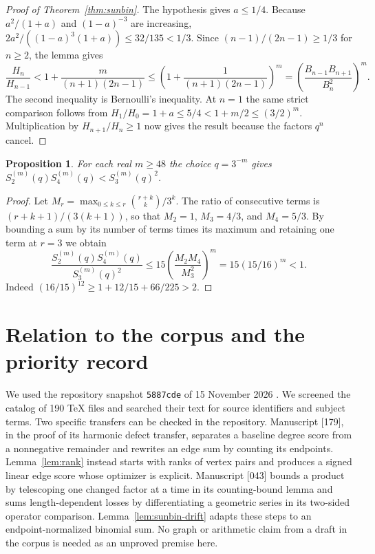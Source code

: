 \documentclass[11pt,a4paper]{article}
\newtheorem{proposition}[theorem]{Proposition}
\theoremstyle{definition}\newtheorem{problem}[theorem]{Problem}
\begin{document}
\begin{proof}[Proof of Theorem~\ref{thm:sunbin}]
The hypothesis gives $a\le1/4$. Because $a^2/(1+a)$ and
$(1-a)^{-3}$ are increasing,
$2a^2/((1-a)^3(1+a))\le 32/135<1/3$. Since
$(n-1)/(2n-1)\ge1/3$ for $n\ge2$, the lemma gives
\[
 \frac{H_n}{H_{n-1}}<
 1+\frac{m}{(n+1)(2n-1)}
 \le\left(1+\frac{1}{(n+1)(2n-1)}\right)^m
 =\left(\frac{B_{n-1}B_{n+1}}{B_n^2}\right)^m.
\]
The second inequality is Bernoulli's inequality. At $n=1$ the same
strict comparison follows from $H_1/H_0=1+a\le5/4<1+m/2\le(3/2)^m$.
Multiplication by $H_{n+1}/H_n\ge1$ now gives the result because the
factors $q^n$ cancel.
\end{proof}

\begin{proposition}\label{prop:sun-small-q}
For each real $m\ge48$ the choice $q=3^{-m}$ gives
$S_2^{(m)}(q)S_4^{(m)}(q)<S_3^{(m)}(q)^2$.
\end{proposition}
\begin{proof}
Let $M_r=\max_{0\le k\le r}\binom{r+k}{k}/3^k$.
The ratio of consecutive terms is $(r+k+1)/(3(k+1))$, so that
$M_2=1$, $M_3=4/3$, and $M_4=5/3$. By bounding a sum by its number
of terms times its maximum and retaining one term at $r=3$ we obtain
\[
 \frac{S_2^{(m)}(q) S_4^{(m)}(q)}{S_3^{(m)}(q)^2}
 \le 15\left(\frac{M_2M_4}{M_3^2}\right)^m
 =15(15/16)^m<1.
\]
Indeed $(16/15)^{12}\ge1+12/15+66/225>2$.
\end{proof}
\section{Relation to the corpus and the priority record}\label{sec:status}
We used the repository snapshot \texttt{5887cde} of 15 November 2026
\cite{vmrc}. We screened the catalog of 190 TeX files and searched their text for source identifiers and subject terms. Two specific transfers can be checked in the repository.
Manuscript [179], in the proof of its harmonic defect transfer, separates
a baseline degree score from a nonnegative remainder and rewrites an edge
sum by counting its endpoints. Lemma~\ref{lem:rank} instead starts with
ranks of vertex pairs and produces a signed linear edge score whose
optimizer is explicit. Manuscript [043] bounds a product by telescoping
one changed factor at a time in its counting-bound lemma and sums
length-dependent losses by differentiating a geometric series in its
two-sided operator comparison. Lemma~\ref{lem:sunbin-drift} adapts these
steps to an endpoint-normalized binomial sum. No graph or arithmetic
claim from a draft in the corpus is needed as an unproved premise here.
\end{document}
